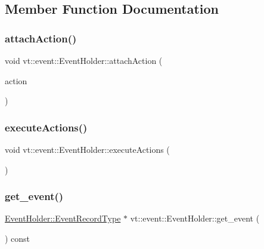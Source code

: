 \subsection{Member Function Documentation}
\mbox{\label{structvt_1_1event_1_1_event_holder_aa5563adb9da7193d0a8260424d756c51}} 
\subsubsection{\texorpdfstring{attach\+Action()}{attachAction()}}
{\footnotesize\ttfamily void vt\+::event\+::\+Event\+Holder\+::attach\+Action (\begin{DoxyParamCaption}\item[{\hyperlink{namespacevt_ae0a5a7b18cc99d7b732cb4d44f46b0f3}{Action\+Type}}]{action }\end{DoxyParamCaption})}

\mbox{\label{structvt_1_1event_1_1_event_holder_a39cab4f8ac00152657fcb2e49497f049}} 
\subsubsection{\texorpdfstring{execute\+Actions()}{executeActions()}}
{\footnotesize\ttfamily void vt\+::event\+::\+Event\+Holder\+::execute\+Actions (\begin{DoxyParamCaption}{ }\end{DoxyParamCaption})}

\mbox{\label{structvt_1_1event_1_1_event_holder_ac679f89c2b133834d0a10181a80c5d47}} 
\subsubsection{\texorpdfstring{get\+\_\+event()}{get\_event()}}
{\footnotesize\ttfamily \hyperlink{structvt_1_1event_1_1_event_holder_adfdec23d67b016b1f028694d5ca5bcff}{Event\+Holder\+::\+Event\+Record\+Type} $\ast$ vt\+::event\+::\+Event\+Holder\+::get\+\_\+event (\begin{DoxyParamCaption}{ }\end{DoxyParamCaption}) const}

